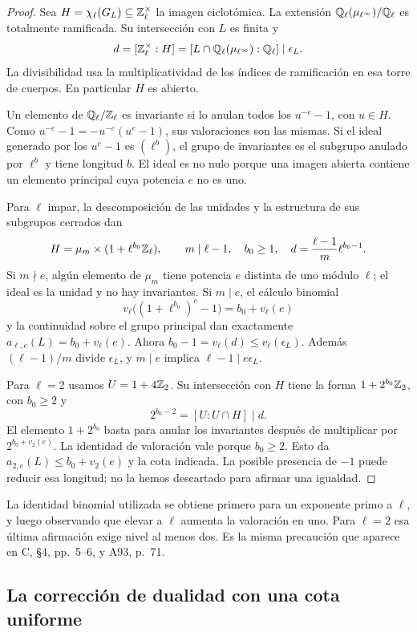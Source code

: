 \begin{proof}
Sea $H=\chi_\ell(G_L)\subseteq\mathbb{Z}_\ell^\times$ la imagen
ciclotómica. La extensión $\mathbb{Q}_\ell(\mu_{\ell^\infty})/\mathbb{Q}_\ell$
es totalmente ramificada. Su intersección con $L$ es finita y
\[
 d=[\mathbb{Z}_\ell^\times:H]
   =[L\cap\mathbb{Q}_\ell(\mu_{\ell^\infty}):\mathbb{Q}_\ell]
   \mid\epsilon_L.
\]
La divisibilidad usa la multiplicatividad de los índices de
ramificación en esa torre de cuerpos. En particular $H$ es abierto.

Un elemento de $\mathbb{Q}_\ell/\mathbb{Z}_\ell$ es invariante si lo anulan todos
los $u^{-e}-1$, con $u\in H$. Como
$u^{-e}-1=-u^{-e}(u^e-1)$, sus valoraciones son las mismas.
Si el ideal generado por los $u^e-1$ es $(\ell^b)$, el grupo
de invariantes es el subgrupo anulado por $\ell^b$ y tiene longitud
$b$. El ideal es no nulo porque una imagen abierta contiene
un elemento principal cuya potencia $e$ no es uno.

Para $\ell$ impar, la descomposición de las unidades y la estructura
de sus subgrupos cerrados dan
\[
 H=\mu_m\times(1+\ell^{b_0}\mathbb{Z}_\ell),\qquad
 m\mid\ell-1,\quad b_0\ge1,\quad
 d=\frac{\ell-1}{m}\ell^{b_0-1}.
\]
Si $m\nmid e$, algún elemento de $\mu_m$ tiene potencia $e$
distinta de uno módulo $\ell$; el ideal es la unidad y no hay
invariantes. Si $m\mid e$, el cálculo binomial
\[
 v_\ell\bigl((1+\ell^{b_0})^e-1\bigr)=b_0+v_\ell(e)
\]
y la continuidad sobre el grupo principal dan exactamente
$a_{\ell,e}(L)=b_0+v_\ell(e)$.
Ahora $b_0-1=v_\ell(d)\le v_\ell(\epsilon_L)$.
Además $(\ell-1)/m$ divide $\epsilon_L$, y $m\mid e$ implica
$\ell-1\mid e\epsilon_L$.

Para $\ell=2$ usamos $U=1+4\mathbb{Z}_2$. Su intersección con $H$ tiene
la forma $1+2^{b_0}\mathbb{Z}_2$, con $b_0\ge2$ y
\[
 2^{b_0-2}=[U:U\cap H]\mid d.
\]
El elemento $1+2^{b_0}$ basta para anular los invariantes después
de multiplicar por $2^{b_0+v_2(e)}$.
La identidad de valoración vale porque $b_0\ge2$.
Esto da $a_{2,e}(L)\le b_0+v_2(e)$ y la cota indicada.
La posible presencia de $-1$ puede reducir esa longitud;
no la hemos descartado para afirmar una igualdad.
\end{proof}

La identidad binomial utilizada se obtiene primero para un exponente
primo a $\ell$, y luego observando que elevar a $\ell$ aumenta la
valoración en uno. Para $\ell=2$ esa última afirmación exige nivel
al menos dos. Es la misma precaución que aparece en C, §4,
pp.~5--6, y A93, p.~71.

\subsection{La corrección de dualidad con una cota uniforme}

